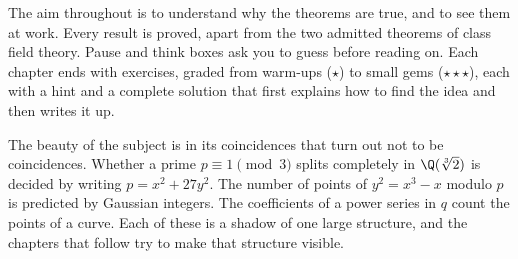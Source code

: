 The aim throughout is to understand why the theorems are true, and to see them at work. Every result is proved, apart from the two admitted theorems of class field theory. Pause
and think boxes ask you to guess before reading on. Each chapter ends with exercises, graded from warm-ups
($\star$) to small gems ($\star\star\star$), each with a hint and a complete solution that first explains how to find
the idea and then writes it up.

The beauty of the subject is in its coincidences that turn out not to be coincidences. Whether a prime $p\equiv1\pmod 3$ splits completely in
$\Q(\sqrt[3]2)$ is decided by writing $p=x^2+27y^2$. The number of points of $y^2=x^3-x$ modulo $p$ is predicted by
Gaussian integers. The coefficients of a power series in $q$ count the points of a curve. Each of these is a shadow of
one large structure, and the chapters that follow try to make that structure visible.
